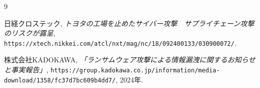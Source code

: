 \documentclass[paper=a4, fontsize=10pt]{jlreq}
\begin{document}
\begin{thebibliography}{9}

   日経クロステック, \textit{トヨタの工場を止めたサイバー攻撃　サプライチェーン攻撃のリスクが露呈}, \texttt{https://xtech.nikkei.com/atcl/nxt/mag/nc/18/092400133/030900072/}.

   株式会社KADOKAWA, \textit{「ランサムウェア攻撃による情報漏洩に関するお知らせと事実報告」}, \texttt{https://group.kadokawa.co.jp/information/media-download/1358/fc37d7bc609b4dd7/}, 2024年.

\end{thebibliography}
\end{document}
